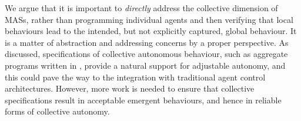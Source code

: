 We argue that it is important 
 to \emph{directly} address the collective dimension of MASs,
 rather than programming individual agents
 and then verifying that local behaviours lead to the intended, but not explicitly captured, global behaviour.
%
It is a matter of abstraction
 and addressing concerns by a proper perspective.
%
As discussed,
 specifications of collective autonomous behaviour,
 such as aggregate programs written in \scafi{},
 provide a natural support for adjustable autonomy,
 and this could pave the way to the integration
 with traditional agent control architectures.
%
However, more work is needed
 to ensure that collective specifications 
 result in acceptable emergent behaviours,
 and hence in reliable forms of collective autonomy.

\printbibliography
